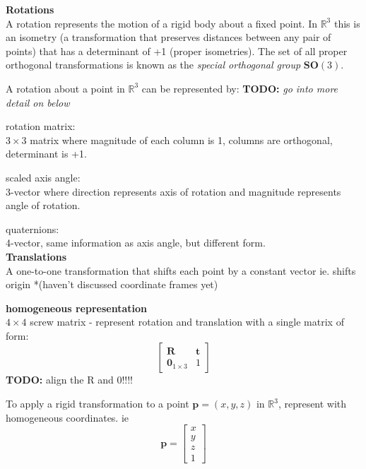 		\textbf{Rotations}\\
		A rotation represents the motion of a rigid body about a fixed point. In $\mathbb{R}^3$ this is an isometry (a transformation that preserves distances between any pair of points) that has a determinant of +1 (proper isometries). The set of all proper orthogonal transformations is known as the \textit{special orthogonal group} $\textbf{SO}(3)$.
		
		A rotation about a point in $\mathbb{R}^3$ can be represented by: \textbf{TODO:} \textit{go into more detail on below}
		
		rotation matrix:\\
		$3 \times 3$ matrix where magnitude of each column is 1, columns are orthogonal, determinant is +1.
		
		scaled axis angle:\\
		3-vector where direction represents axis of rotation and magnitude represents angle of rotation.		
		
		quaternions:\\
		4-vector, same information as axis angle, but different form.\\
		
		\textbf{Translations}\\
		A one-to-one transformation that shifts each point by a constant vector ie. shifts origin *(haven't discussed coordinate frames yet) 

		\textbf{homogeneous representation}\\
		$4 \times 4$ screw matrix - represent rotation and translation with a single matrix of form:\\
		
		\begin{equation}
				\begin{bmatrix}
				  \mathbf{R}	&	\mathbf{t} \\
				  \textbf{0}_{1 \times 3}		& 	1 
				\end{bmatrix}
		\end{equation}
		\textbf{TODO:} align the R and 0!!!!

		To apply a rigid transformation to a point $\textbf{p} = (x,y,z) $ in $\mathbb{R}^3$, represent with homogeneous coordinates. ie
		\begin{equation}
		\mathbf{p} = 
		\begin{bmatrix}
				  x	\\
				  y	\\
				  z	\\
				  1	
		\end{bmatrix}
		\end{equation}
	

